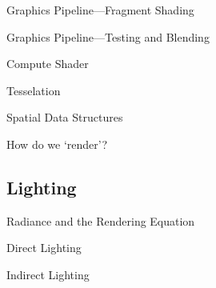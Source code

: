 \documentclass[10pt]{beamer}
\begin{document}
\begin{frame}{Graphics Pipeline---Fragment Shading}

\end{frame}

\begin{frame}{Graphics Pipeline---Testing and Blending}

\end{frame}

\begin{frame}{Compute Shader}
\end{frame}

\begin{frame}{Tesselation}
\end{frame}

\begin{frame}{Spatial Data Structures}
\end{frame}

\begin{frame}{How do we `render'?}
\end{frame}

\subsection{Lighting}
\begin{frame}{Radiance and the Rendering Equation}
\end{frame}

\begin{frame}{Direct Lighting}
\end{frame}

\begin{frame}{Indirect Lighting}
\end{frame}
\end{document}
